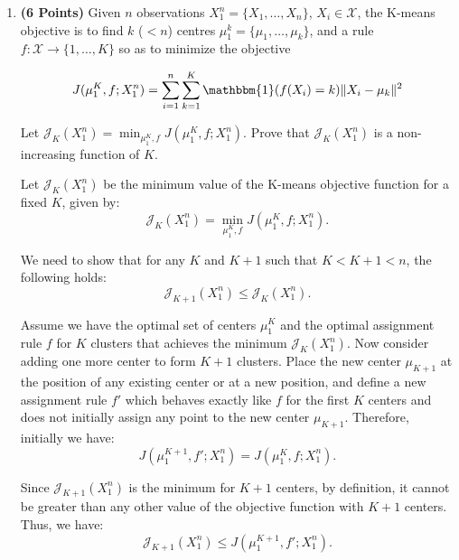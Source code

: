 \documentclass[a4paper]{article}
\newcommand{\Xcal}{\mathcal{X}}
\newcommand{\Jcal}{\mathcal{J}}
\newcommand{\indfone}{\mathbbm{1}}
\theoremstyle{definition}
\newenvironment{soln}{
    \leavevmode\color{blue}\ignorespaces
}{}
\begin{document}
\begin{enumerate}

\item \textbf{(6 Points)}
Given $n$ observations $X_1^n = \{X_1, \dots, X_n\}$, $X_i \in \Xcal$, the K-means objective
is to find $k$
($<n$) centres $\mu_1^k = \{\mu_1, \dots, \mu_k\}$, and a rule $f:\Xcal \rightarrow
\{1,\dots, K\}$ so as to minimize the objective

\begin{equation}
J(\mu_1^K, f; X_1^n) = \sum_{i=1}^n \sum_{k=1}^K \indfone(f(X_i) = k) \|X_i - \mu_k\|^2
\label{eqn:kmeans}
\end{equation}

Let $\Jcal_K(X_1^n) = \min_{\mu_1^K, f} J(\mu_1^K, f; X_1^n)$. Prove that
$\Jcal_{K}(X_1^n)$ is a non-increasing function of $K$.

\begin{soln}
  Let \( \Jcal_K(X_1^n) \) be the minimum value of the K-means objective function for a fixed \( K \), given by:
  \begin{equation}
      \Jcal_K(X_1^n) = \min_{\mu_1^K, f} J(\mu_1^K, f; X_1^n).
  \end{equation}

  We need to show that for any \( K \) and \( K+1 \) such that \( K < K+1 < n \), the following holds:
  \begin{equation}
      \Jcal_{K+1}(X_1^n) \leq \Jcal_K(X_1^n).
  \end{equation}

  Assume we have the optimal set of centers \( \mu_1^K \) and the optimal assignment rule \( f \) for \( K \) clusters that achieves the minimum \( \Jcal_K(X_1^n) \). Now consider adding one more center to form \( K+1 \) clusters. Place the new center \( \mu_{K+1} \) at the position of any existing center or at a new position, and define a new assignment rule \( f' \) which behaves exactly like \( f \) for the first \( K \) centers and does not initially assign any point to the new center \( \mu_{K+1} \). Therefore, initially we have:
  \begin{equation}
      J(\mu_1^{K+1}, f'; X_1^n) = J(\mu_1^K, f; X_1^n).
  \end{equation}

  Since \( \Jcal_{K+1}(X_1^n) \) is the minimum for \( K+1 \) centers, by definition, it cannot be greater than any other value of the objective function with \( K+1 \) centers. Thus, we have:
  \begin{equation}
      \Jcal_{K+1}(X_1^n) \leq J(\mu_1^{K+1}, f'; X_1^n).
  \end{equation}


\end{soln}
\end{enumerate}
\end{document}
